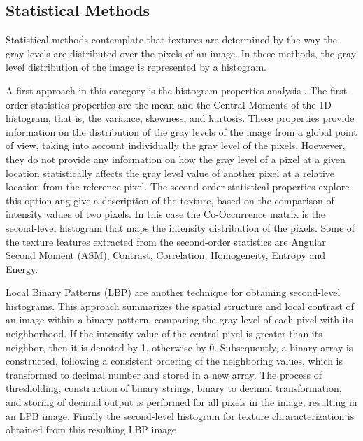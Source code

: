 \subsection{Statistical Methods}
Statistical methods contemplate that textures are determined by the way the gray levels are distributed over the pixels of an image. In these methods, the gray level distribution of the image is represented by a histogram.

A first approach in this category is the histogram properties analysis \citep{Aggarwal.K.Agrawal:JSIP:2012}. The first-order statistics properties are the mean and the Central Moments of the 1D histogram, that is, the variance, skewness, and kurtosis. These properties provide information on the distribution of the gray levels of the image from a global point of view, taking into account individually the gray level of the pixels. Hoewever, they do not provide any information on how the gray level of a pixel at a given location statistically affects the gray level value of another pixel at a relative location from the reference pixel.
The second-order statistical properties explore this option ang give a description of the texture, based on the comparison of intensity values of two pixels. In this case the Co-Occurrence matrix \citep{Haralick.Shanmugam.ea:TSMC:1973} is the second-level histogram that maps the intensity distribution of the pixels. Some of the texture features extracted from the second-order statistics are Angular Second Moment (ASM), Contrast, Correlation, Homogeneity, Entropy and Energy.

Local Binary Patterns (LBP) \citep{Ojala.Pietikainen.ea:PR:1996} are another technique for obtaining second-level histograms. This approach summarizes the spatial structure and local contrast of an image within a binary pattern, comparing the gray level of each pixel with its neighborhood. If the intensity value of the central pixel is greater than its neighbor, then it is denoted by 1, otherwise by 0. Subsequently, a binary array is constructed, following a consistent ordering of the neighboring values, which is transformed to decimal number and stored in a new array. The process of thresholding, construction of binary strings, binary to decimal transformation, and storing of decimal output is performed for all pixels in the image, resulting in an LPB image. Finally the second-level histogram for texture chraracterization is obtained from this resulting LBP image.

